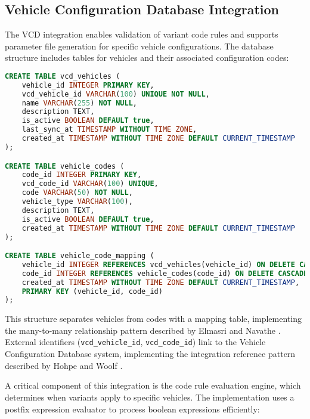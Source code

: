 \subsection{Vehicle Configuration Database Integration}
\label{subsec:vcd-integration}

The \ac{VCD} integration enables validation of variant code rules and supports parameter file generation for specific vehicle configurations. The database structure includes tables for vehicles and their associated configuration codes:

\begin{lstlisting}[language=SQL, caption={Vehicle Configuration Tables}, label={lst:vehicle-configuration}]
CREATE TABLE vcd_vehicles (
    vehicle_id INTEGER PRIMARY KEY,
    vcd_vehicle_id VARCHAR(100) UNIQUE NOT NULL,
    name VARCHAR(255) NOT NULL,
    description TEXT,
    is_active BOOLEAN DEFAULT true,
    last_sync_at TIMESTAMP WITHOUT TIME ZONE,
    created_at TIMESTAMP WITHOUT TIME ZONE DEFAULT CURRENT_TIMESTAMP
);

CREATE TABLE vehicle_codes (
    code_id INTEGER PRIMARY KEY,
    vcd_code_id VARCHAR(100) UNIQUE,
    code VARCHAR(50) NOT NULL,
    vehicle_type VARCHAR(100),
    description TEXT,
    is_active BOOLEAN DEFAULT true,
    created_at TIMESTAMP WITHOUT TIME ZONE DEFAULT CURRENT_TIMESTAMP
);

CREATE TABLE vehicle_code_mapping (
    vehicle_id INTEGER REFERENCES vcd_vehicles(vehicle_id) ON DELETE CASCADE,
    code_id INTEGER REFERENCES vehicle_codes(code_id) ON DELETE CASCADE,
    created_at TIMESTAMP WITHOUT TIME ZONE DEFAULT CURRENT_TIMESTAMP,
    PRIMARY KEY (vehicle_id, code_id)
);
\end{lstlisting}

This structure separates vehicles from codes with a mapping table, implementing the many-to-many relationship pattern described by Elmasri and Navathe \cite{elmasri2015fundamentals}. External identifiers (\texttt{vcd\_vehicle\_id}, \texttt{vcd\_code\_id}) link to the Vehicle Configuration Database system, implementing the integration reference pattern described by Hohpe and Woolf \cite{hohpe2002enterprise}.

A critical component of this integration is the code rule evaluation engine, which determines when variants apply to specific vehicles. The implementation uses a postfix expression evaluator to process boolean expressions efficiently:


